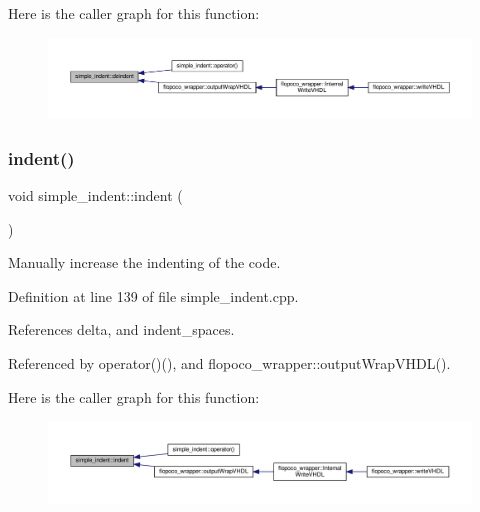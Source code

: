 Here is the caller graph for this function\+:
\nopagebreak
\begin{figure}[H]
\begin{center}
\leavevmode
\includegraphics[width=350pt]{db/d73/classsimple__indent_ae22b30d747a97908e638a655364e498f_icgraph}
\end{center}
\end{figure}
\mbox{\label{classsimple__indent_aa88aafba2edf16742b332625ef292a20}} 
\subsubsection{\texorpdfstring{indent()}{indent()}}
{\footnotesize\ttfamily void simple\+\_\+indent\+::indent (\begin{DoxyParamCaption}{ }\end{DoxyParamCaption})}



Manually increase the indenting of the code. 



Definition at line 139 of file simple\+\_\+indent.\+cpp.



References delta, and indent\+\_\+spaces.



Referenced by operator()(), and flopoco\+\_\+wrapper\+::output\+Wrap\+V\+H\+D\+L().

Here is the caller graph for this function\+:
\nopagebreak
\begin{figure}[H]
\begin{center}
\leavevmode
\includegraphics[width=350pt]{db/d73/classsimple__indent_aa88aafba2edf16742b332625ef292a20_icgraph}
\end{center}
\end{figure}
\mbox{\label{classsimple__indent_a3199d4f7593b10ca63ab8955e43f3985}} 

